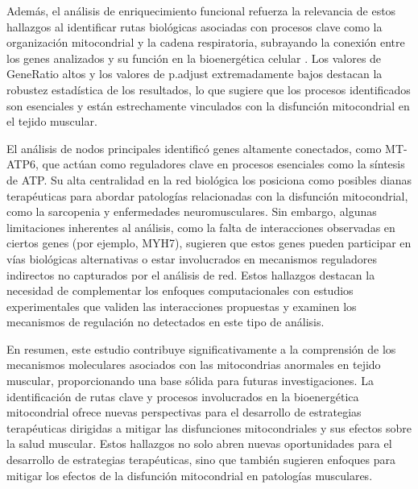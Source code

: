 Además, el análisis de enriquecimiento funcional refuerza la relevancia de estos hallazgos al identificar rutas biológicas asociadas con procesos clave como la organización mitocondrial y la cadena respiratoria, subrayando la conexión entre los genes analizados y su función en la bioenergética celular \cite{Cameron2011}. Los valores de GeneRatio altos y los valores de p.adjust extremadamente bajos destacan la robustez estadística de los resultados, lo que sugiere que los procesos identificados son esenciales y están estrechamente vinculados con la disfunción mitocondrial en el tejido muscular.

El análisis de nodos principales identificó genes altamente conectados, como MT-ATP6, que actúan como reguladores clave en procesos esenciales como la síntesis de ATP. Su alta centralidad en la red biológica los posiciona como posibles dianas terapéuticas para abordar patologías relacionadas con la disfunción mitocondrial, como la sarcopenia y enfermedades neuromusculares.
Sin embargo, algunas limitaciones inherentes al análisis, como la falta de interacciones observadas en ciertos genes (por ejemplo, MYH7), sugieren que estos genes pueden participar en vías biológicas alternativas o estar involucrados en mecanismos reguladores indirectos no capturados por el análisis de red. Estos hallazgos destacan la necesidad de complementar los enfoques computacionales con estudios experimentales que validen las interacciones propuestas y examinen los mecanismos de regulación no detectados en este tipo de análisis.

En resumen, este estudio contribuye significativamente a la comprensión de los mecanismos moleculares asociados con las mitocondrias anormales en tejido muscular, proporcionando una base sólida para futuras investigaciones. La identificación de rutas clave y procesos involucrados en la bioenergética mitocondrial ofrece nuevas perspectivas para el desarrollo de estrategias terapéuticas dirigidas a mitigar las disfunciones mitocondriales y sus efectos sobre la salud muscular.
 Estos hallazgos no solo abren nuevas oportunidades para el desarrollo de estrategias terapéuticas, sino que también sugieren enfoques para mitigar los efectos de la disfunción mitocondrial en patologías musculares.